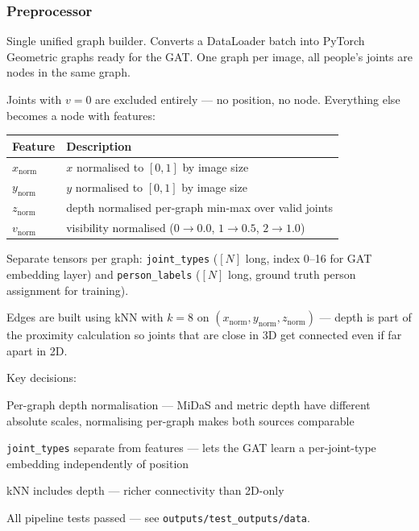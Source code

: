 \subsubsection{Preprocessor}

Single unified graph builder. Converts a DataLoader batch into PyTorch Geometric graphs ready for the GAT. One graph per image, all people's joints are nodes in the same graph.

Joints with $v=0$ are excluded entirely --- no position, no node. Everything else becomes a node with features:

\begin{center}
\begin{tabular}{ll}
\toprule
Feature & Description \\
\midrule
$x_{\text{norm}}$ & $x$ normalised to $[0, 1]$ by image size \\
$y_{\text{norm}}$ & $y$ normalised to $[0, 1]$ by image size \\
$z_{\text{norm}}$ & depth normalised per-graph min-max over valid joints \\
$v_{\text{norm}}$ & visibility normalised ($0 \to 0.0$, $1 \to 0.5$, $2 \to 1.0$) \\
\bottomrule
\end{tabular}
\end{center}

Separate tensors per graph: \texttt{joint\_types} ($[N]$ long, index 0--16 for GAT embedding layer) and \texttt{person\_labels} ($[N]$ long, ground truth person assignment for training).

Edges are built using kNN with $k=8$ on $(x_{\text{norm}}, y_{\text{norm}}, z_{\text{norm}})$ --- depth is part of the proximity calculation so joints that are close in 3D get connected even if far apart in 2D.

Key decisions:
\begin{compactitem}
  \item Per-graph depth normalisation --- MiDaS and metric depth have different absolute scales, normalising per-graph makes both sources comparable
  \item \texttt{joint\_types} separate from features --- lets the GAT learn a per-joint-type embedding independently of position
  \item kNN includes depth --- richer connectivity than 2D-only
\end{compactitem}

All pipeline tests passed --- see \texttt{outputs/test\_outputs/data}.


